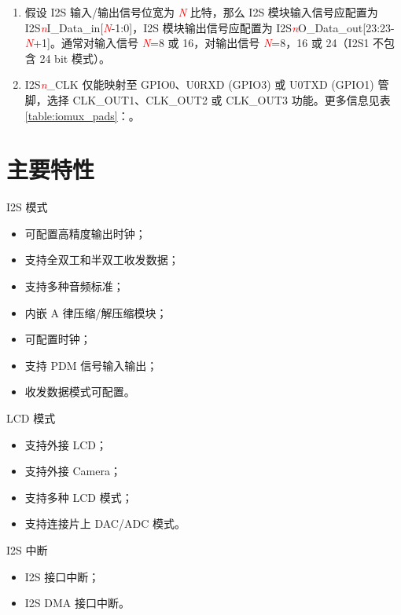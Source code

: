 \documentclass[main\_\_CN.tex]{subfiles}
\begin{document}
\vspace{-0.5em}
\begin{tiplisting}
\vspace{-2em}
\begin{enumerate}
    \item 假设 I2S 输入/输出信号位宽为 \textcolor{red}{\it{N}} 比特，那么 I2S 模块输入信号应配置为 I2S\textcolor{red}{\it{n}}I\_Data\_in[\textcolor{red}{\it{N}}-1:0]，I2S  模块输出信号应配置为 I2S\textcolor{red}{\it{n}}O\_Data\_out[23:23-\textcolor{red}{\it{N}}+1]。通常对输入信号 \textcolor{red}{\it{N}}=8 或 16，对输出信号 \textcolor{red}{\it{N}}=8，16 或 24（I2S1 不包含 24 bit 模式）。
    \item I2S\textcolor{red}{\it{n}}\_CLK 仅能映射至 GPIO0、U0RXD (GPIO3) 或 U0TXD (GPIO1) 管脚，选择 CLK\_OUT1、CLK\_OUT2 或 CLK\_OUT3 功能。更多信息见表 \ref{table:iomux_pads}：\textit{}。
\end{enumerate}
\end{tiplisting}

\section{主要特性}
I2S 模式
\begin{itemize}
    \item 可配置高精度输出时钟；
    \item 支持全双工和半双工收发数据；
    \item 支持多种音频标准；
    \item 内嵌 A 律压缩/解压缩模块；
    \item 可配置时钟；
    \item 支持 PDM 信号输入输出；
    \item 收发数据模式可配置。
\end{itemize}

LCD 模式
\begin{itemize}
    \item 支持外接 LCD；
    \item 支持外接 Camera；
    \item 支持多种 LCD 模式；
    \item 支持连接片上 DAC/ADC 模式。
\end{itemize}

I2S 中断
\begin{itemize}
    \item I2S 接口中断；
    \item I2S DMA 接口中断。
\end{itemize}
\end{document}
